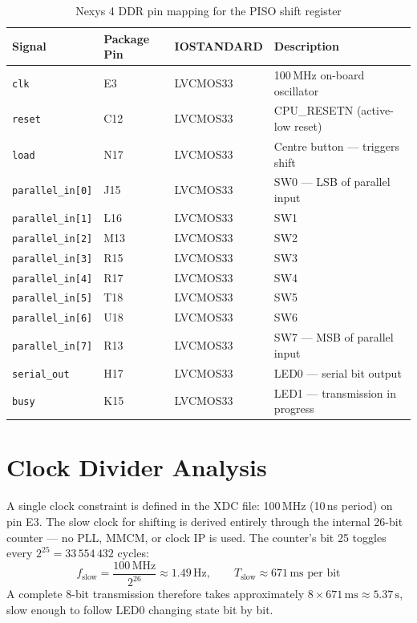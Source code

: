 \documentclass[12pt,a4paper]{report}
\begin{document}
\begin{table}[H]
  \centering
  \caption{Nexys 4 DDR pin mapping for the PISO shift register}
  \label{tab:pins}
  \begin{tabularx}{\linewidth}{lllX}
    \toprule
    \textbf{Signal} & \textbf{Package Pin} & \textbf{IOSTANDARD} & \textbf{Description} \\
    \midrule
    \texttt{clk}              & E3   & LVCMOS33 & 100\,MHz on-board oscillator \\
    \texttt{reset}            & C12  & LVCMOS33 & CPU\_RESETN (active-low reset) \\
    \texttt{load}             & N17  & LVCMOS33 & Centre button --- triggers shift \\
    \texttt{parallel\_in[0]}  & J15  & LVCMOS33 & SW0 --- LSB of parallel input \\
    \texttt{parallel\_in[1]}  & L16  & LVCMOS33 & SW1 \\
    \texttt{parallel\_in[2]}  & M13  & LVCMOS33 & SW2 \\
    \texttt{parallel\_in[3]}  & R15  & LVCMOS33 & SW3 \\
    \texttt{parallel\_in[4]}  & R17  & LVCMOS33 & SW4 \\
    \texttt{parallel\_in[5]}  & T18  & LVCMOS33 & SW5 \\
    \texttt{parallel\_in[6]}  & U18  & LVCMOS33 & SW6 \\
    \texttt{parallel\_in[7]}  & R13  & LVCMOS33 & SW7 --- MSB of parallel input \\
    \texttt{serial\_out}      & H17  & LVCMOS33 & LED0 --- serial bit output \\
    \texttt{busy}             & K15  & LVCMOS33 & LED1 --- transmission in progress \\
    \bottomrule
  \end{tabularx}
\end{table}

\section{Clock Divider Analysis}

A single clock constraint is defined in the XDC file: 100\,MHz (10\,ns period) on pin E3. The slow clock for shifting is derived entirely through the internal 26-bit counter --- no PLL, MMCM, or clock IP is used. The counter's bit 25 toggles every $2^{25} = 33\,554\,432$ cycles:
\[
  f_{\text{slow}} = \frac{100\,\text{MHz}}{2^{26}} \approx 1.49\,\text{Hz},
  \qquad
  T_{\text{slow}} \approx 671\,\text{ms per bit}
\]
A complete 8-bit transmission therefore takes approximately $8 \times 671\,\text{ms} \approx 5.37\,\text{s}$, slow enough to follow LED0 changing state bit by bit.
\end{document}
